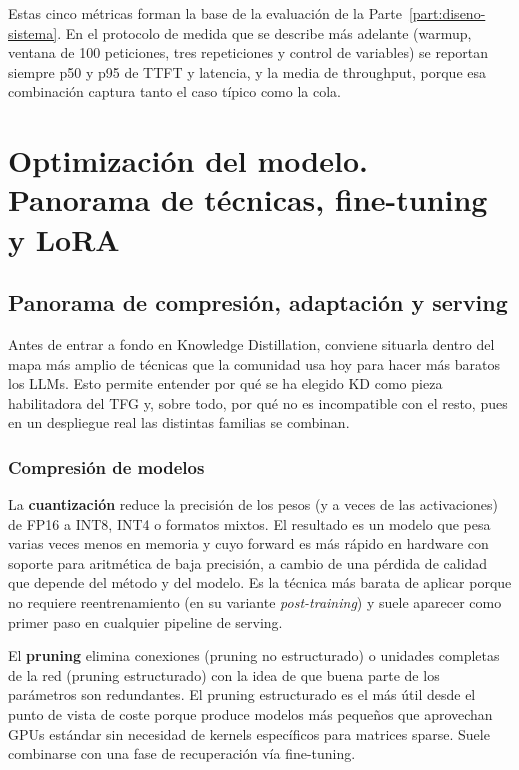 \documentclass[11pt,a4paper]{article}
\begin{document}
Estas cinco métricas forman la base de la evaluación de la Parte~\ref{part:diseno-sistema}. En el protocolo de medida que se describe más adelante (warmup, ventana de 100 peticiones, tres repeticiones y control de variables) se reportan siempre p50 y p95 de TTFT y latencia, y la media de throughput, porque esa combinación captura tanto el caso típico como la cola.

\section{Optimización del modelo. Panorama de técnicas, fine-tuning y LoRA}
\label{sec:optim-modelo}

\subsection{Panorama de compresión, adaptación y serving}
\label{sec:panorama-opt}

Antes de entrar a fondo en Knowledge Distillation, conviene situarla dentro del mapa más amplio de técnicas que la comunidad usa hoy para hacer más baratos los LLMs. Esto permite entender por qué se ha elegido KD como pieza habilitadora del TFG y, sobre todo, por qué no es incompatible con el resto, pues en un despliegue real las distintas familias se combinan.

\subsubsection{Compresión de modelos}

La \textbf{cuantización} reduce la precisión de los pesos (y a veces de las activaciones) de FP16 a INT8, INT4 o formatos mixtos. El resultado es un modelo que pesa varias veces menos en memoria y cuyo forward es más rápido en hardware con soporte para aritmética de baja precisión, a cambio de una pérdida de calidad que depende del método y del modelo. Es la técnica más barata de aplicar porque no requiere reentrenamiento (en su variante \textit{post-training}) y suele aparecer como primer paso en cualquier pipeline de serving.

El \textbf{pruning} elimina conexiones (pruning no estructurado) o unidades completas de la red (pruning estructurado) con la idea de que buena parte de los parámetros son redundantes. El pruning estructurado es el más útil desde el punto de vista de coste porque produce modelos más pequeños que aprovechan GPUs estándar sin necesidad de kernels específicos para matrices sparse. Suele combinarse con una fase de recuperación vía fine-tuning.
\end{document}
